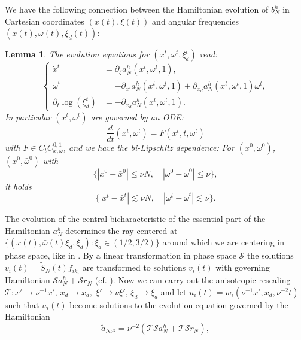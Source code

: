 \documentclass{amsart}
\numberwithin{equation}{section}
\newtheorem{lemma}[theorem]{Lemma}
\theoremstyle{definition}
\begin{document}
We have the following connection between the Hamiltonian evolution of $b_N^h$ in Cartesian coordinates $(x(t),\xi(t))$ and angular frequencies $(x(t),\omega(t),\xi_d(t))$:
\begin{lemma}
\label{lem:AnisotropicBiLipschitz}
The evolution equations for $(x^t, \omega^t, \xi_d^t)$ read:
\begin{equation}
\label{eq:ModifiedHamiltonian}
\left\{ \begin{array}{cl}
\dot{x}^t &= \partial_{\xi} a_N^h(x^t, \omega^t, 1), \\
\dot{\omega}^t &= - \partial_{x'} a_N^h(x^t,\omega^t,1) + \partial_{x_d} a_N^h(x^t,\omega^t,1) \omega^t, \\
\partial_t \log(\xi_d^t) &= - \partial_{x_d} a_N^h(x^t,\omega^t,1).
\end{array} \right.
\end{equation}
In particular $(x^t,\omega^t)$ are governed by an ODE:
\begin{equation*}
\frac{d}{dt} (x^t, \omega^t) = F(x^t,t,\omega^t)
\end{equation*}
with $F \in C_t C^{0,1}_{x,\omega}$, and we have the bi-Lipschitz dependence: For $(x^0,\omega^0)$, $(\bar{x}^0,\bar{\omega}^0)$ with 
\begin{equation*}
\{ |x^0 - \bar{x}^0| \leq \nu N, \quad |\omega^0 - \bar{\omega}^0| \leq \nu \},
\end{equation*}
it holds
\begin{equation*}
\{ |x^t - \bar{x}^t| \lesssim \nu N, \quad |\omega^t - \bar{\omega}^t| \lesssim \nu \}.
\end{equation*}
\end{lemma}
The evolution of the central bicharacteristic of the essential part of the Hamiltonian $a_N^h$ determines the ray centered at $\{ (\bar{x}(t),\bar{\omega}(t) \xi_d, \xi_d ) : \xi_d \in (1/2,3/2) \}$ around which we are centering in phase space, like in \cite[Section~5.3.2]{SchippaTataru2025}. By a linear transformation in phase space $\mathcal{S}$ the solutions $v_i(t) = \tilde{S}_N(t) f_{i k_i}$ are transformed to solutions $v_i(t)$ with governing Hamiltonian $\mathcal{S} a_N^h + \mathcal{S} r_N$ (cf. \cite[Lemma~5.12,~Lemma~5.13]{SchippaTataru2025}). Now we can carry out the anisotropic rescaling $\mathcal{T}: x' \to \nu^{-1} x', \, x_d \to x_d, \; \xi' \to \nu \xi', \, \xi_d \to \xi_d$ and let $u_i(t) = w_i(\nu^{-1} x', x_d, \nu^{-2} t)$ such that $u_i(t)$ become solutions to the evolution equation governed by the Hamiltonian
\begin{equation*}
\tilde{a}_{N \nu^2} = \nu^{-2}( \mathcal{T} \mathcal{S} a_N^h + \mathcal{T} \mathcal{S} r_N),
\end{equation*}
\end{document}
